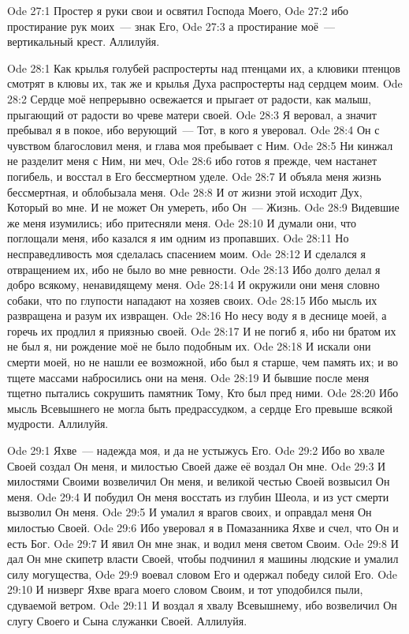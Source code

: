 \vs Ode 27:1
Простер я руки
свои и освятил Господа Моего,
\vs Ode 27:2
ибо
простирание рук моих~--- знак Его,
\vs Ode 27:3
а простирание
моё~--- вертикальный крест.
Аллилуйя.

\vs Ode 28:1
Как крылья
голубей распростерты над птенцами их, а клювики птенцов смотрят в клювы их, так
же и крылья Духа распростерты над сердцем моим.
\vs Ode 28:2
Сердце моё
непрерывно освежается и прыгает от радости, как малыш, прыгающий от радости во
чреве матери своей.
\vs Ode 28:3
Я веровал, а
значит пребывал я в покое, ибо верующий~--- Тот, в кого я уверовал.
\vs Ode 28:4
Он с чувством
благословил меня, и глава моя пребывает с Ним.
\vs Ode 28:5
Ни кинжал не
разделит меня с Ним, ни меч,
\vs Ode 28:6
ибо готов я
прежде, чем настанет погибель, и восстал в Его бессмертном уделе.
\vs Ode 28:7
И объяла меня
жизнь бессмертная, и облобызала меня.
\vs Ode 28:8
И от жизни
этой исходит Дух, Который во мне. И не может Он умереть, ибо Он~--- Жизнь.
\vs Ode 28:9
Видевшие же
меня изумились; ибо притесняли меня.
\vs Ode 28:10
И думали они,
что поглощали меня, ибо казался я им одним из пропавших.
\vs Ode 28:11
Но
несправедливость моя сделалась спасением моим.
\vs Ode 28:12
И сделался я
отвращением их, ибо не было во мне ревности.
\vs Ode 28:13
Ибо долго
делал я добро всякому, ненавидящему меня.
\vs Ode 28:14
И окружили
они меня словно собаки, что по глупости нападают на хозяев своих.
\vs Ode 28:15
Ибо мысль их
развращена и разум их извращен.
\vs Ode 28:16
Но несу воду
я в деснице моей, а горечь их продлил я приязнью своей.
\vs Ode 28:17
И не погиб я,
ибо ни братом их не был я, ни рождение моё не было подобным их.
\vs Ode 28:18
И искали они
смерти моей, но не нашли ее возможной, ибо был я старше, чем память их; и во
тщете массами набросились они на меня.
\vs Ode 28:19
И бывшие
после меня тщетно пытались сокрушить памятник Тому, Кто был пред ними.
\vs Ode 28:20
Ибо мысль
Всевышнего не могла быть предрассудком, а сердце Его превыше всякой мудрости.
Аллилуйя.

\vs Ode 29:1
Яхве~--- надежда
моя, и да не устыжусь Его.
\vs Ode 29:2
Ибо во хвале
Своей создал Он меня, и милостью Своей даже её воздал Он мне.
\vs Ode 29:3
И милостями
Своими возвеличил Он меня, и великой честью Своей возвысил Он меня.
\vs Ode 29:4
И побудил Он
меня восстать из глубин Шеола, и из уст смерти вызволил Он меня.
\vs Ode 29:5
И умалил я
врагов своих, и оправдал меня Он милостью Своей.
\vs Ode 29:6
Ибо уверовал я
в Помазанника Яхве и счел, что Он и есть Бог.
\vs Ode 29:7
И явил Он мне
знак, и водил меня светом Своим.
\vs Ode 29:8
И дал Он мне
скипетр власти Своей, чтобы подчинил я машины людские и умалил силу могущества,
\vs Ode 29:9
воевал словом
Его и одержал победу силой Его.
\vs Ode 29:10
И низверг
Яхве врага моего словом Своим, и тот уподобился пыли, сдуваемой ветром.
\vs Ode 29:11
И воздал я
хвалу Всевышнему, ибо возвеличил Он слугу Своего и Сына служанки Своей.
Аллилуйя.

